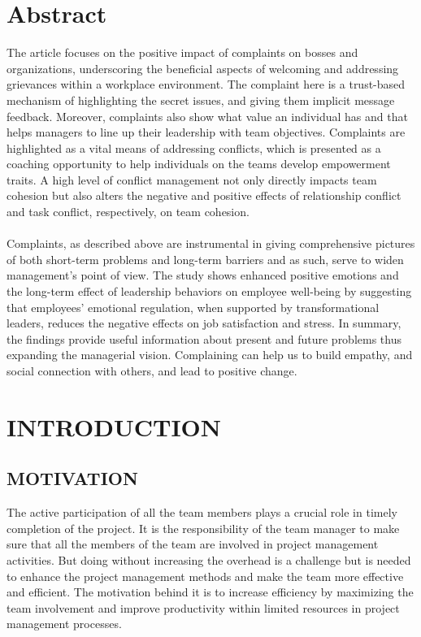 \documentclass[a4paper,12pt]{article}
\begin{document}
\section*{Abstract}
The article focuses on the positive impact of complaints on bosses and organizations, underscoring the beneficial aspects of welcoming and addressing grievances within a workplace environment. The complaint here is a trust-based mechanism of highlighting the secret issues, and giving them implicit message feedback. Moreover, complaints also show what value an individual has and that helps managers to line up their leadership with team objectives. Complaints are highlighted as a vital means of addressing conflicts, which is presented as a coaching opportunity to help individuals on the teams develop empowerment traits. A high level of conflict management not only directly impacts team cohesion but also alters the negative and positive effects of relationship conflict and task conflict, respectively, on team cohesion.
\\\\
Complaints, as described above are instrumental in giving comprehensive pictures of both short-term problems and long-term barriers and as such, serve to widen management's point of view. The study shows enhanced positive emotions and the long-term effect of leadership behaviors on employee well-being by suggesting that employees' emotional regulation, when supported by transformational leaders, reduces the negative effects on job satisfaction and stress. In summary, the findings provide useful information about present and future problems thus expanding the managerial vision. Complaining can help us to build empathy, and social connection with others, and lead to positive change.
\newpage
\section{INTRODUCTION}


\subsection{MOTIVATION}
The active participation of all the team members plays a crucial role in timely completion of the project. It is the responsibility of the team manager to make sure that all the members of the team are involved in project management activities. But doing without increasing the overhead is a challenge but is needed to enhance the project management methods and make the team more effective and efficient.
The motivation behind it is to increase efficiency by maximizing the team involvement and improve productivity within limited resources in project management processes. 
\end{document}
